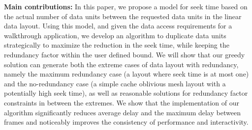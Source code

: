{\bf Main contributions:}
In this paper, we propose a model for seek time based on the actual
number of data units
between the requested data units in the linear data layout. Using this model, and given
the data access requirements for a walkthrough application, we develop
an algorithm to duplicate data units strategically to maximize the reduction
in the seek time, while keeping the redundancy factor within the user defined
bound. We will show that our greedy solution can generate both the extreme cases
of data layout with redundancy, namely the maximum redundancy case
(a layout where seek time is at most one) and the no-redundancy case (a simple
cache oblivious mesh layout with a potentially high seek time), as well as
reasonable solutions for redundancy factor constraints in between the extremes.
We show that the
implementation of our algorithm significantly reduces average delay and the maximum delay between
frames and noticeably improves the consistency of performance and
interactivity.